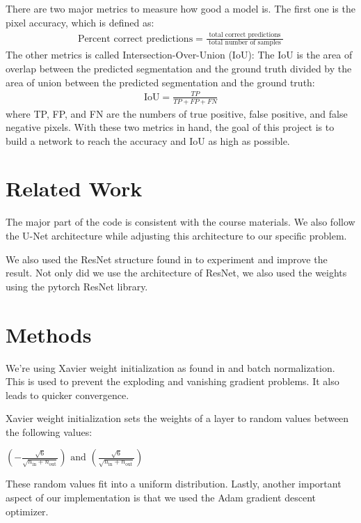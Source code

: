 \documentclass{article}
\begin{document}
There are two major metrics to measure how good a model is. The first one is the pixel accuracy, which is defined as:
\begin{eqnarray}
    \text{Percent correct predictions} =\frac{\text { total correct predictions }}{\text { total number of samples }}
\end{eqnarray}
The other metrics is called Intersection-Over-Union (IoU): The IoU is the area of overlap between the predicted segmentation and the ground truth divided by the area of union between the predicted segmentation and the ground truth:
\begin{eqnarray}
    \mathrm{IoU}=\frac{T P}{T P+F P+F N}
\end{eqnarray}
where TP, FP, and FN are the numbers of true positive, false positive, and false negative pixels. 
With these two metrics in hand, the goal of this project is to build a network to reach the accuracy and IoU as high as possible.


\section{Related Work}
The major part of the code is consistent with the course materials. We also follow the \cite{ronneberger_u-net_2015} U-Net architecture while adjusting this architecture to our specific problem.

We also used the ResNet structure found in \cite{he_deep_2015} to experiment and improve the result. Not only did we use the architecture of ResNet, we also used the weights using the pytorch ResNet library.

\section{Methods}\label{sec:method}

We’re using Xavier weight initialization as found in \cite{glorot2010understanding} and batch normalization. This is used to prevent the exploding and vanishing gradient problems. It also leads to quicker convergence.

Xavier weight initialization sets the weights of a layer to random values between the following values:

$\left(-\frac{\sqrt{6}}{\sqrt{n_{\text{in}} + n_{\text{out}}}}\right) \text{ and } \left( \frac{\sqrt{6}}{\sqrt{n_{\text{in}} + n_{\text{out}}}}\right)$

These random values fit into a uniform distribution. Lastly, another important aspect of our implementation is that we used the Adam gradient descent optimizer.
\end{document}

